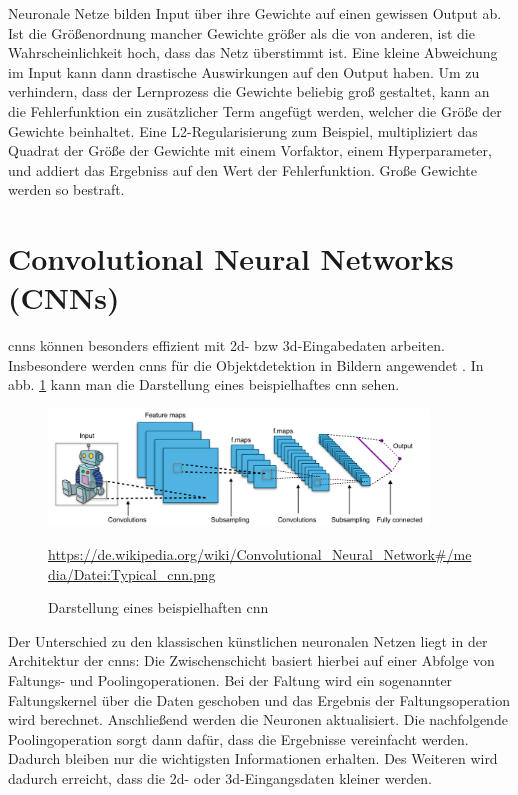 Neuronale Netze bilden Input über ihre Gewichte auf einen gewissen Output ab. Ist die Größenordnung mancher Gewichte größer als die von anderen, ist die Wahrscheinlichkeit hoch, dass das Netz überstimmt ist. Eine kleine Abweichung im Input kann dann drastische Auswirkungen auf den Output haben.
Um zu verhindern, dass der Lernprozess die Gewichte beliebig groß gestaltet, kann an die Fehlerfunktion ein zusätzlicher Term angefügt werden, welcher die Größe der Gewichte beinhaltet. Eine L2-Regularisierung zum Beispiel, multipliziert das Quadrat der Größe der Gewichte mit einem Vorfaktor, einem Hyperparameter, und addiert das Ergebniss auf den Wert der Fehlerfunktion. Große Gewichte werden so bestraft.


\section{Convolutional Neural Networks (CNNs)}

	\acf{cnns} können besonders effizient mit \acs{2d}- \acs{bzw} \acs{3d}-Eingabedaten arbeiten. Insbesondere werden \acs{cnns} für die Objektdetektion in Bildern angewendet \cite{datasolut4}. In \acs{abb.} \ref{example-cnn} kann man die Darstellung eines beispielhaftes \acs{cnn} sehen. \\
	
	\begin{figure}[H]
		\centering
		\includegraphics[width=0.9\textwidth]{kapitel3/images/cnn.png}
		\caption{Darstellung eines beispielhaften \acs{cnn}}
		\label{example-cnn}
		\vspace{0.2cm}
		\quelle\url{https://de.wikipedia.org/wiki/Convolutional_Neural_Network#/media/Datei:Typical_cnn.png}
	\end{figure}

	Der Unterschied zu den klassischen künstlichen neuronalen Netzen liegt in der Architektur der \acs{cnns}: Die Zwischenschicht basiert hierbei auf einer Abfolge von Faltungs- und Poolingoperationen. Bei der Faltung wird ein sogenannter Faltungskernel über die Daten geschoben und das Ergebnis der Faltungsoperation wird berechnet. Anschließend werden die Neuronen aktualisiert. Die nachfolgende Poolingoperation sorgt dann dafür, dass die Ergebnisse vereinfacht werden. Dadurch bleiben nur die wichtigsten Informationen erhalten.	Des Weiteren wird dadurch erreicht, dass die \acs{2d}- oder \acs{3d}-Eingangsdaten kleiner werden. \cite{datasolut4}
	
